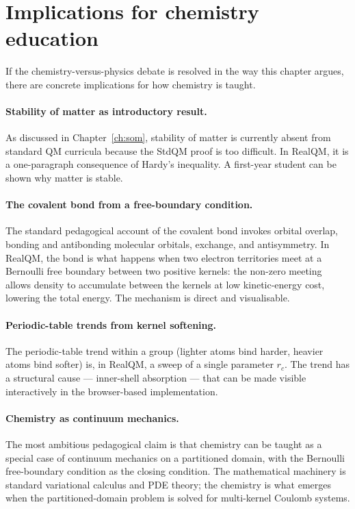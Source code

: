 \section{Implications for chemistry education}\label{sec:education}

If the chemistry-versus-physics debate is resolved in the way this chapter argues, there are concrete implications for how chemistry is taught.

\paragraph{Stability of matter as introductory result.}
As discussed in Chapter~\ref{ch:som}, stability of matter is currently absent from standard QM curricula because the StdQM proof is too difficult. In RealQM, it is a one-paragraph consequence of Hardy's inequality. A first-year student can be shown why matter is stable.

\paragraph{The covalent bond from a free-boundary condition.}
The standard pedagogical account of the covalent bond invokes orbital overlap, bonding and antibonding molecular orbitals, exchange, and antisymmetry. In RealQM, the bond is what happens when two electron territories meet at a Bernoulli free boundary between two positive kernels: the non-zero meeting allows density to accumulate between the kernels at low kinetic-energy cost, lowering the total energy. The mechanism is direct and visualisable.

\paragraph{Periodic-table trends from kernel softening.}
The periodic-table trend within a group (lighter atoms bind harder, heavier atoms bind softer) is, in RealQM, a sweep of a single parameter $r_c$. The trend has a structural cause --- inner-shell absorption --- that can be made visible interactively in the browser-based implementation.

\paragraph{Chemistry as continuum mechanics.}
The most ambitious pedagogical claim is that chemistry can be taught as a special case of continuum mechanics on a partitioned domain, with the Bernoulli free-boundary condition as the closing condition. The mathematical machinery is standard variational calculus and PDE theory; the chemistry is what emerges when the partitioned-domain problem is solved for multi-kernel Coulomb systems.

